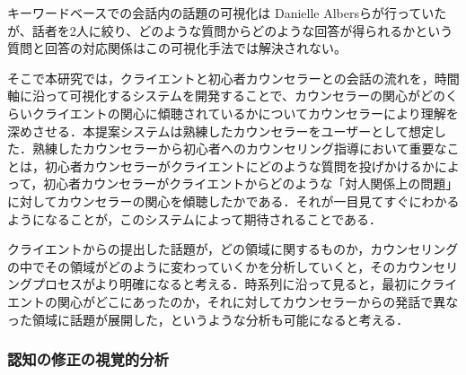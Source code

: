 \documentclass[shuuron]{kuee}
\begin{document}
キーワードベースでの会話内の話題の可視化は Danielle Albersら\cite{angus2012conceptual}が行っていたが、話者を2人に絞り、どのような質問からどのような回答が得られるかという質問と回答の対応関係はこの可視化手法では解決されない。

そこで本研究では，クライエントと初心者カウンセラーとの会話の流れを，時間軸に沿って可視化するシステムを開発することで、カウンセラーの関心がどのくらいクライエントの関心に傾聴されているかについてカウンセラーにより理解を深めさせる．本提案システムは熟練したカウンセラーをユーザーとして想定した．熟練したカウンセラーから初心者へのカウンセリング指導において重要なことは，初心者カウンセラーがクライエントにどのような質問を投げかけるかによって，初心者カウンセラーがクライエントからどのような「対人関係上の問題」に対してカウンセラーの関心を傾聴したかである．それが一目見てすぐにわかるようになることが，このシステムによって期待されることである．%



クライエントからの提出した話題が，どの領域に関するものか，カウンセリングの中でその領域がどのように変わっていくかを分析していくと，そのカウンセリングプロセスがより明確になると考える．時系列に沿って見ると，最初にクライエントの関心がどこにあったのか，それに対してカウンセラーからの発話で異なった領域に話題が展開した，というような分析も可能になると考える．



\subsubsection{認知の修正の視覚的分析}

\end{document}
